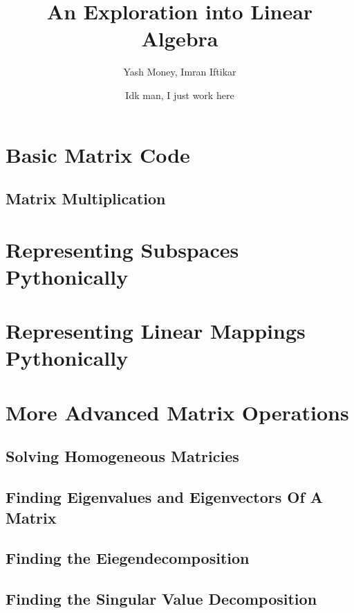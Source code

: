 \documentclass[12pt, a4paper]{article}
\title{An Exploration into Linear Algebra}
\author{Yash Money, Imran Iftikar}
\date{Idk man, I just work here}
\begin{document}
\maketitle


\section{Basic Matrix Code}

\subsection{Matrix Multiplication}

\section{Representing Subspaces Pythonically}

\section{Representing Linear Mappings Pythonically}

\section{More Advanced Matrix Operations}

\subsection{Solving Homogeneous Matricies}

\subsection{Finding Eigenvalues and Eigenvectors Of A Matrix}

\subsection{Finding the Eiegendecomposition}

\subsection{Finding the Singular Value Decomposition}
\end{document}
